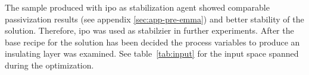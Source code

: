 The sample produced with \gls{ipo} as stabilization agent showed comparable passivization results (see appendix \ref{sec:app-pre-emma}) and better stability of the solution. 
Therefore, \gls{ipo} was used  as stabilzier in further experiments.
After the base recipe for the solution has been decided
the process variables to produce an insulating layer was examined. 
See table~\ref{tab:input} for the input space spanned during the optimization.

